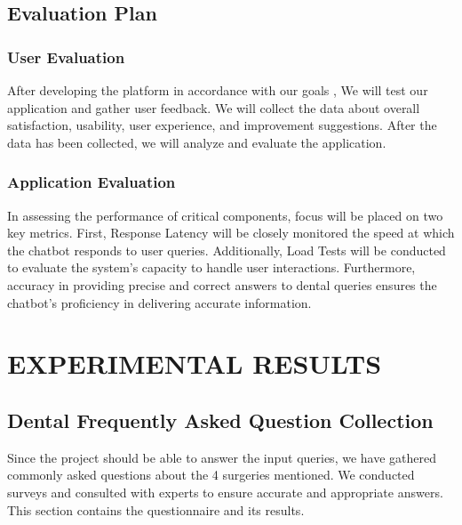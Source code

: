 \documentclass[12pt,oneside,openright,a4paper]{cpe-english-project}
\begin{document}
  \section{Evaluation Plan}
    \subsection{User Evaluation}
      \qquad After developing the platform in accordance with our goals , We will test our application and gather user feedback. We will collect the data about overall satisfaction, usability, user experience, and improvement suggestions. After the data has been collected, we will analyze and evaluate the application. \par
    \subsection{Application Evaluation}
      \qquad In assessing the performance of critical components, focus will be placed on two key metrics. First, Response Latency will be closely monitored the speed at which the chatbot responds to user queries. Additionally, Load Tests will be conducted to evaluate the system's capacity to handle user interactions. Furthermore, accuracy in providing precise and correct answers to dental queries ensures the chatbot's proficiency in delivering accurate information. \par

\chapter{EXPERIMENTAL RESULTS}
  \section{Dental Frequently Asked Question Collection}
    \qquad Since the project should be able to answer the input queries, we have gathered commonly asked questions about the 4 surgeries mentioned. We conducted surveys and consulted with experts to ensure accurate and appropriate answers. This section contains the questionnaire and its results. \par
\end{document}
